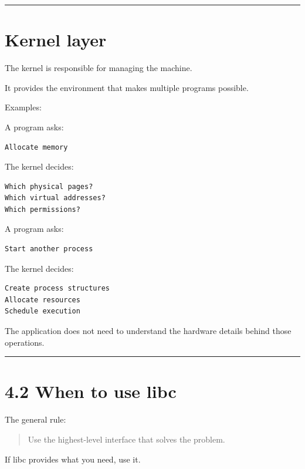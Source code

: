 \documentclass[
  oneside,
  openany]{book}
\begin{document}
\begin{center}\rule{0.5\linewidth}{0.5pt}\end{center}

\hypertarget{kernel-layer}{%
\section{Kernel layer}\label{kernel-layer}}

The kernel is responsible for managing the machine.

It provides the environment that makes multiple programs possible.

Examples:

A program asks:

\begin{verbatim}
Allocate memory
\end{verbatim}

The kernel decides:

\begin{verbatim}
Which physical pages?
Which virtual addresses?
Which permissions?
\end{verbatim}

A program asks:

\begin{verbatim}
Start another process
\end{verbatim}

The kernel decides:

\begin{verbatim}
Create process structures
Allocate resources
Schedule execution
\end{verbatim}

The application does not need to understand the hardware details behind
those operations.

\begin{center}\rule{0.5\linewidth}{0.5pt}\end{center}

\hypertarget{when-to-use-libc}{%
\section{4.2 When to use libc}\label{when-to-use-libc}}

The general rule:

\begin{quote}
Use the highest-level interface that solves the problem.
\end{quote}

If libc provides what you need, use it.
\end{document}

